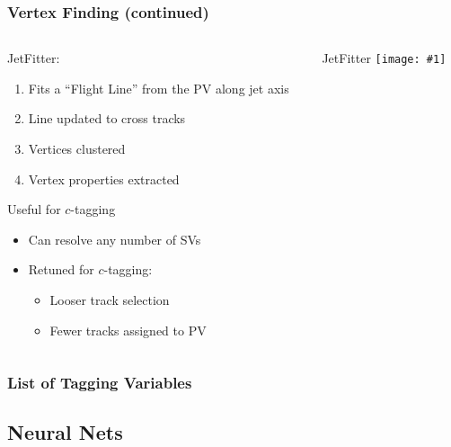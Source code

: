 \documentclass[usenames,dvipsnames]{beamer}
\newcommand{\widegraphic}[1]{\texttt{[image: \#1]}}
\begin{document}
\begin{frame}
  \frametitle{Vertex Finding (continued)}
  \begin{columns}
    \begin{column}{0.5\textwidth}
      JetFitter:
      \begin{enumerate}
      \item Fits a ``Flight Line'' from the PV along jet axis
      \item Line updated to cross tracks
      \item Vertices clustered
      \item Vertex properties extracted
      \end{enumerate}
      Useful for $c$-tagging
      \begin{itemize}
      \item Can resolve any number of SVs
      \item Retuned for $c$-tagging:
        \begin{itemize}
        \item Looser track selection
        \item Fewer tracks assigned to PV
        \end{itemize}
      \end{itemize}
    \end{column}
    \begin{column}{0.5\textwidth}
        \begin{center}
          JetFitter
      \widegraphic{figures/external/b-jet-jf.pdf}
        \end{center}
    \end{column}
  \end{columns}
\end{frame}

\begin{frame}
  \frametitle{List of Tagging Variables}
  \resizebox{\textwidth}{!}{}
\end{frame}

\subsection{Neural Nets}
\end{document}
